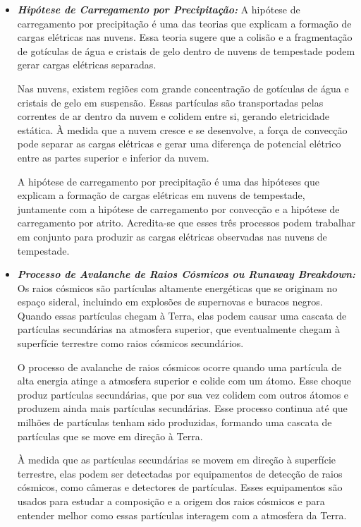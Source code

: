 \documentclass[a4paper, 12pt, onecolumn,singlespacing]{article}
\begin{document}
\begin{itemize}
\begin{itemize}
			\item \textbf{\textit{Hipótese de Carregamento por Precipitação: }}A hipótese de carregamento por precipitação é uma das teorias que explicam a formação de cargas elétricas nas nuvens. Essa teoria sugere que a colisão e a fragmentação de gotículas de água e cristais de gelo dentro de nuvens de tempestade podem gerar cargas elétricas separadas.
			
			Nas nuvens, existem regiões com grande concentração de gotículas de água e cristais de gelo em suspensão. Essas partículas são transportadas pelas correntes de ar dentro da nuvem e colidem entre si, gerando eletricidade estática. À medida que a nuvem cresce e se desenvolve, a força de convecção pode separar as cargas elétricas e gerar uma diferença de potencial elétrico entre as partes superior e inferior da nuvem.
			
			A hipótese de carregamento por precipitação é uma das hipóteses que explicam a formação de cargas elétricas em nuvens de tempestade, juntamente com a hipótese de carregamento por convecção e a hipótese de carregamento por atrito. Acredita-se que esses três processos podem trabalhar em conjunto para produzir as cargas elétricas observadas nas nuvens de tempestade.
			
			\item \textbf{\textit{Processo de Avalanche de Raios Cósmicos ou Runaway Breakdown: }} 
			Os raios cósmicos são partículas altamente energéticas que se originam no espaço sideral, incluindo em explosões de supernovas e buracos negros. Quando essas partículas chegam à Terra, elas podem causar uma cascata de partículas secundárias na atmosfera superior, que eventualmente chegam à superfície terrestre como raios cósmicos secundários.
			
			O processo de avalanche de raios cósmicos ocorre quando uma partícula de alta energia atinge a atmosfera superior e colide com um átomo. Esse choque produz partículas secundárias, que por sua vez colidem com outros átomos e produzem ainda mais partículas secundárias. Esse processo continua até que milhões de partículas tenham sido produzidas, formando uma cascata de partículas que se move em direção à Terra.
			
			À medida que as partículas secundárias se movem em direção à superfície terrestre, elas podem ser detectadas por equipamentos de detecção de raios cósmicos, como câmeras e detectores de partículas. Esses equipamentos são usados para estudar a composição e a origem dos raios cósmicos e para entender melhor como essas partículas interagem com a atmosfera da Terra.
			

\end{itemize}
\end{itemize}
\end{document}
